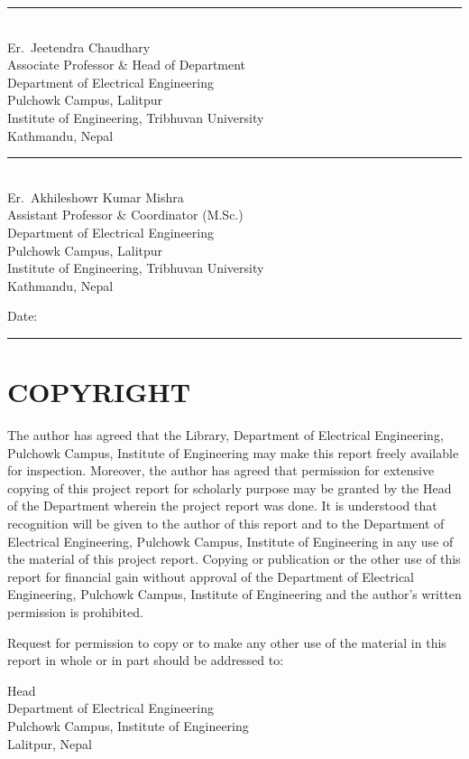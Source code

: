\documentclass[12pt,a4paper]{article}
\newcommand{\fronthead}[1]{\clearpage\phantomsection\section*{#1}\addcontentsline{toc}{section}{#1}}
\begin{document}
\vspace{1.5cm}
\noindent\rule{0.62\linewidth}{0.4pt}\\
Er.~Jeetendra Chaudhary\\
Associate Professor \& Head of Department\\
Department of Electrical Engineering\\
Pulchowk Campus, Lalitpur\\
Institute of Engineering, Tribhuvan University\\
Kathmandu, Nepal

\vspace{1.3cm}
\noindent\rule{0.62\linewidth}{0.4pt}\\
Er.~Akhileshowr Kumar Mishra\\
Assistant Professor \& Coordinator (M.Sc.)\\
Department of Electrical Engineering\\
Pulchowk Campus, Lalitpur\\
Institute of Engineering, Tribhuvan University\\
Kathmandu, Nepal

\vspace{1.3cm}
\noindent Date: \rule{5.5cm}{0.4pt}

\fronthead{COPYRIGHT}
The author has agreed that the Library, Department of Electrical Engineering, Pulchowk Campus, Institute of
Engineering may make this report freely available for inspection. Moreover, the author has agreed that
permission for extensive copying of this project report for scholarly purpose may be granted by the Head of
the Department wherein the project report was done. It is understood that recognition will be given to the author of this report and to
the Department of Electrical Engineering, Pulchowk Campus, Institute of Engineering in any use of the material of
this project report. Copying or publication or the other use of this report for financial gain without approval
of the Department of Electrical Engineering, Pulchowk Campus, Institute of Engineering and the author's written
permission is prohibited.

Request for permission to copy or to make any other use of the material in this report in whole or in part
should be addressed to:

\noindent Head\\ Department of Electrical Engineering\\ Pulchowk Campus, Institute of Engineering\\ Lalitpur, Nepal
\end{document}
